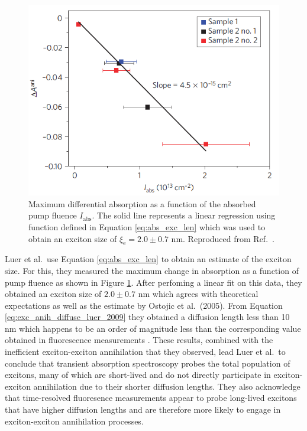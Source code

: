 \begin{figure}[ht]
	\centering
	\includegraphics[scale=0.8]{images/chapter_prior_works/exciton_size_fit_luer_2009}
	\caption{Maximum differential absorption as a function of the absorbed pump fluence $I_\text{abs}$. The solid line represents a linear regression using function defined in Equation \eqref{eq:abs_exc_len} which was used to obtain an exciton size of $\xi_\text{e} = 2.0 \pm 0.7$ nm. Reproduced from Ref.\ \cite{luer2009size}.}
	\label{fig:lin_fit_luer_2009}
\end{figure}

Luer et al.\ use Equation \eqref{eq:abs_exc_len} to obtain an estimate of the exciton size. For this, they measured the maximum change in absorption as a function of pump fluence as shown in Figure \ref{fig:lin_fit_luer_2009}. After perfoming a linear fit on this data, they obtained an exciton size of $2.0 \pm 0.7$ nm which agrees with theoretical expectations \cite{spataru2004excitonic, chang2004excitons, tretiak2007excitons} as well as the estimate by Ostojic et al.\ (2005). From Equation \eqref{eq:exc_anih_diffuse_luer_2009} they obtained a diffusion length less than 10 nm which happens to be an order of magnitude less than the corresponding value obtained in fluorescence measurements \cite{cognet2007stepwise}. These results, combined with the inefficient exciton-exciton annihilation that they observed, lead Luer et al.\ to conclude that transient absorption spectroscopy probes the total population of excitons, many of which are short-lived and do not directly participate in exciton-exciton annihilation due to their shorter diffusion lengths. They also acknowledge that time-resolved fluoresence measurements appear to probe long-lived excitons that have higher diffusion lengths and are therefore more likely to engage in exciton-exciton annihilation processes.

